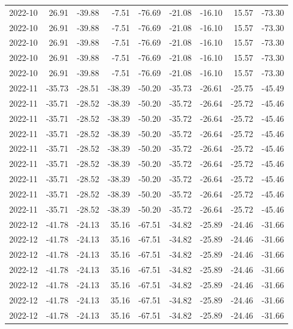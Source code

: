 \begin{table}[ht]
\begin{tabular}{lrrrrrrrr}
  2022-10 & 26.91 & -39.88 & -7.51 & -76.69 & -21.08 & -16.10 & 15.57 & -73.30 \\ 
  2022-10 & 26.91 & -39.88 & -7.51 & -76.69 & -21.08 & -16.10 & 15.57 & -73.30 \\ 
  2022-10 & 26.91 & -39.88 & -7.51 & -76.69 & -21.08 & -16.10 & 15.57 & -73.30 \\ 
  2022-10 & 26.91 & -39.88 & -7.51 & -76.69 & -21.08 & -16.10 & 15.57 & -73.30 \\ 
  2022-10 & 26.91 & -39.88 & -7.51 & -76.69 & -21.08 & -16.10 & 15.57 & -73.30 \\ 
  2022-11 & -35.73 & -28.51 & -38.39 & -50.20 & -35.73 & -26.61 & -25.75 & -45.49 \\ 
  2022-11 & -35.71 & -28.52 & -38.39 & -50.20 & -35.72 & -26.64 & -25.72 & -45.46 \\ 
  2022-11 & -35.71 & -28.52 & -38.39 & -50.20 & -35.72 & -26.64 & -25.72 & -45.46 \\ 
  2022-11 & -35.71 & -28.52 & -38.39 & -50.20 & -35.72 & -26.64 & -25.72 & -45.46 \\ 
  2022-11 & -35.71 & -28.52 & -38.39 & -50.20 & -35.72 & -26.64 & -25.72 & -45.46 \\ 
  2022-11 & -35.71 & -28.52 & -38.39 & -50.20 & -35.72 & -26.64 & -25.72 & -45.46 \\ 
  2022-11 & -35.71 & -28.52 & -38.39 & -50.20 & -35.72 & -26.64 & -25.72 & -45.46 \\ 
  2022-11 & -35.71 & -28.52 & -38.39 & -50.20 & -35.72 & -26.64 & -25.72 & -45.46 \\ 
  2022-11 & -35.71 & -28.52 & -38.39 & -50.20 & -35.72 & -26.64 & -25.72 & -45.46 \\ 
  2022-12 & -41.78 & -24.13 & 35.16 & -67.51 & -34.82 & -25.89 & -24.46 & -31.66 \\ 
  2022-12 & -41.78 & -24.13 & 35.16 & -67.51 & -34.82 & -25.89 & -24.46 & -31.66 \\ 
  2022-12 & -41.78 & -24.13 & 35.16 & -67.51 & -34.82 & -25.89 & -24.46 & -31.66 \\ 
  2022-12 & -41.78 & -24.13 & 35.16 & -67.51 & -34.82 & -25.89 & -24.46 & -31.66 \\ 
  2022-12 & -41.78 & -24.13 & 35.16 & -67.51 & -34.82 & -25.89 & -24.46 & -31.66 \\ 
  2022-12 & -41.78 & -24.13 & 35.16 & -67.51 & -34.82 & -25.89 & -24.46 & -31.66 \\ 
  2022-12 & -41.78 & -24.13 & 35.16 & -67.51 & -34.82 & -25.89 & -24.46 & -31.66 \\ 

\end{tabular}
\end{table}

